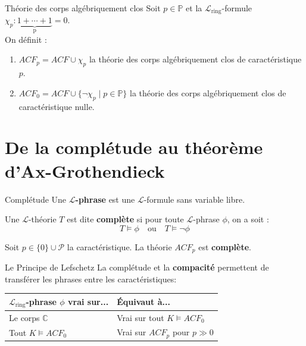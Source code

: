 \documentclass{beamer}
\begin{document}
\begin{frame}{Théorie des corps algébriquement clos}
Soit $p \in \mathbb{P}$ et la $\mathcal{L}_{\text{ring}}$-formule $\chi_p : \underbrace{1 + \cdots + 1}_\text{p} = 0$.\\On définit :
\begin{enumerate}
\item $ACF_p = ACF \cup \chi_p$ la théorie des corps algébriquement clos de caractéristique $p$.
\item $ACF_0 = ACF \cup \{\neg\chi_p \mid p \in \mathbb{P}\}$ la théorie des corps algébriquement clos de caractéristique nulle.
\end{enumerate}
\end{frame}

  \section{De la complétude au théorème d'Ax-Grothendieck}
\begin{frame}{Complétude}
    Une $\mathcal{L}$\textbf{-phrase} est une $\mathcal{L}$-formule sans variable libre.
    \begin{definition}
        Une $\mathcal{L}$-théorie $T$ est dite \textbf{complète} si pour toute $\mathcal{L}$-phrase $\phi$, on a soit :
        \[ T \models \phi \quad \text{ou} \quad T \models \neg\phi \]
    \end{definition}
    
    \pause
    \begin{theorem}
        Soit $p \in \{0\} \cup \mathcal{P}$ la caractéristique. La théorie $ACF_p$ est \textbf{complète}.
    \end{theorem}
\end{frame}


\begin{frame}{Le Principe de Lefschetz}
    La complétude et la \textbf{compacité} permettent de transférer les phrases entre les caractéristiques:
    
    \begin{table}
        \centering
        \begin{tabular}{ll}
            \toprule
            \textbf{$\mathcal{L}_{\text{ring}}$-phrase $\phi$ vrai sur...} & \textbf{Équivaut à...} \\
            \midrule
            Le corps $\mathbb{C}$ & Vrai sur tout $K \models ACF_0$ \\
            Tout $K \models ACF_0$ & Vrai sur $ACF_p$ pour $p \gg 0$ \\
            \bottomrule
        \end{tabular}
    \end{table}
\end{frame}
\end{document}
